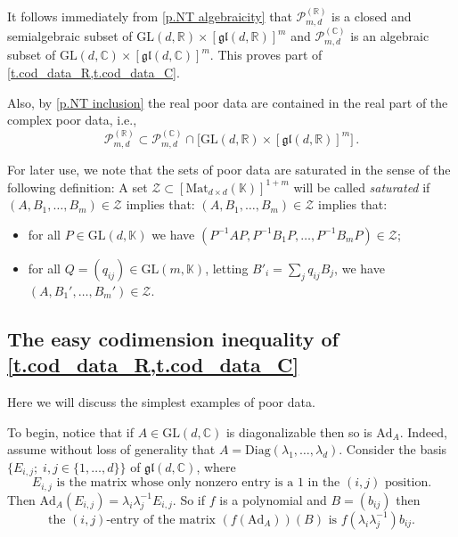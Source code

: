 \documentclass[10pt, a4paper]{amsart}
\theoremstyle{plain}
\theoremstyle{definition}
\theoremstyle{remark}
\theoremstyle{note}
\numberwithin{equation}{section}
\begin{document}
It follows immediately from \cref{p.NT algebraicity} that 
${\mathcal{P}}_{m,d}^{({\mathbb{R}})}$ is a closed and semialgebraic subset of ${\mathrm{GL}}(d,{\mathbb{R}}) \times [{\mathfrak{gl}}(d,{\mathbb{R}})]^m$
and ${\mathcal{P}}_{m,d}^{({\mathbb{C}})}$ is an algebraic subset of ${\mathrm{GL}}(d,{\mathbb{C}}) \times [{\mathfrak{gl}}(d,{\mathbb{C}})]^m$.
This proves part of \cref{t.cod_data_R,t.cod_data_C}.

Also, by \cref{p.NT inclusion} the real poor data are contained in the real part of the complex poor data, i.e.,
\begin{equation}\label{e.RC_inclusion}
{\mathcal{P}}_{m,d}^{({\mathbb{R}})} \subset {\mathcal{P}}_{m,d}^{({\mathbb{C}})} \cap \big[ {\mathrm{GL}}(d,{\mathbb{R}}) \times [{\mathfrak{gl}}(d,{\mathbb{R}})]^m \big] \, .
\end{equation}

\medskip

For later use, we note that the sets of poor data
are saturated in the sense of the following definition: 
A set ${\mathcal{Z}} \subset [{\mathrm{Mat}}_{d\times d}({\mathbb{K}})]^{1+m}$
will be called \emph{saturated}
if $(A, B_1, \dots, B_m) \in {\mathcal{Z}}$ implies that:
$(A, B_1, \dots, B_m) \in {\mathcal{Z}}$ implies that:
\begin{itemize}
\item 
for all $P \in {\mathrm{GL}}(d,{\mathbb{K}})$ we have $(P^{-1}AP, P^{-1}B_1 P, \dots, P^{-1}B_m P) \in {\mathcal{Z}}$;
\item 
for all $Q = (q_{ij}) \in {\mathrm{GL}}(m,{\mathbb{K}})$, letting $B'_i = \sum_j q_{ij} B_j$,
we have $(A, B_1', \dots, B_m') \in {\mathcal{Z}}$.
\end{itemize}

\subsection{The easy codimension inequality of \cref{t.cod_data_R,t.cod_data_C}}
\label{ss.cod_data_easy_half}

Here we will discuss the simplest examples of poor data.

To begin, notice that if $A \in {\mathrm{GL}}(d,{\mathbb{C}})$ is diagonalizable
then so is ${\mathrm{Ad}}_A$.
Indeed, assume without loss of generality that $A = {\mathrm{Diag}}(\lambda_1, \dots, \lambda_d)$.
Consider the basis $\{E_{i,j} ; \; i,j \in \{1,\dots,d\}\} $ of ${\mathfrak{gl}}(d,{\mathbb{C}})$,
where 
\begin{equation}\label{e.Eij}
\text{$E_{i,j}$ is the matrix whose only nonzero entry is a $1$ in the $(i,j)$ position.}
\end{equation}
Then ${\mathrm{Ad}}_A (E_{i,j}) = \lambda_i \lambda_j^{-1} E_{i,j}$.
So if $f$ is a polynomial and $B = (b_{ij})$ then 
\begin{equation}\label{e.poly entry}
\text{the $(i,j)$-entry of the matrix $(f({\mathrm{Ad}}_A))(B)$ is  
$f(\lambda_i\lambda_j^{-1})b_{ij}$.}
\end{equation}
\end{document}
